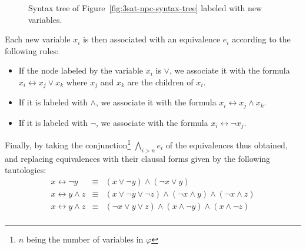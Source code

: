 \begin{example}
    \begin{figure}[htb]
        \begin{center}
        \end{center}
        \caption{Syntax tree of Figure~\ref{fig:3sat-npc-syntax-tree} labeled with new variables.}
        \label{fig:3sat-npc-var-tree}
    \end{figure}

    Each new variable \(x_i\) is then associated with an equivalence \(e_i\) according to the following rules:
    \begin{itemize}
        \item If the node labeled by the variable \(x_i\) is \(\vee\), we associate it with the formula \(x_i \leftrightarrow x_j \vee x_k\) where \(x_j\) and \(x_k\) are the children of \(x_i\).
        \item If it is labeled with \(\wedge\), we associate it with the formula \(x_i \leftrightarrow x_j \wedge x_k\).
        \item If it is labeled with \(\neg\), we associate with the formula \(x_i \leftrightarrow \neg x_j\).
    \end{itemize}

    Finally, by taking the conjunction\footnote{\(n\) being the number of variables in \(\varphi\)} 
    \(\bigwedge\limits_{i>n}e_i\) of the equivalences thus obtained, and replacing equivalences with their clausal forms given by the following tautologies:
    \[
        \begin{array}{rcl}
            x \leftrightarrow \neg y &\equiv& (x\vee\neg y)\wedge (\neg x \vee y) \\
            x \leftrightarrow y \wedge z &\equiv& (x\vee\neg y\vee\neg z) \wedge 
            (\neg x \wedge y) \wedge (\neg x \wedge z) \\
            x \leftrightarrow y \wedge z &\equiv& (\neg x\vee y\vee z) \wedge 
            (x \wedge\neg y) \wedge (x \wedge\neg z) \\
        \end{array}
    \]


\end{example}
